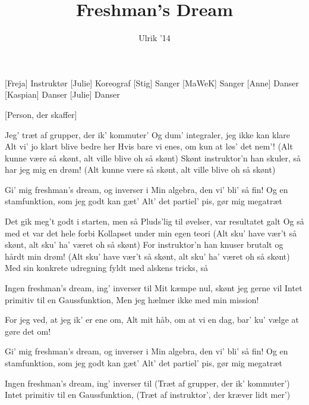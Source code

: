 \documentclass[a4paper,11pt]{article}
\title{Freshman's Dream}
\author{Ulrik '14}
\begin{document}
\maketitle

\begin{roles}
[Freja] Instruktør
[Julie] Koreograf
[Stig] Sanger
[MaWeK] Sanger
[Anne] Danser
[Kaspian] Danser
[Julie] Danser

\end{roles}

\begin{props}
[Person, der skaffer]
\end{props}


\begin{song}
 Jeg' træt af grupper, der ik' kommuter'
Og dum' integraler, jeg ikke kan klare
 Alt vi’ jo klart blive bedre her
Hvis bare vi enes, om kun at løs' det nem'!
 (Alt kunne være så skønt, alt ville blive oh så skønt)
 Skønt instruktor'n han skuler, så har jeg mig en drøm!
 (Alt kunne være så skønt, alt ville blive oh så skønt)

 Gi' mig freshman's dream, og inverser i
Min algebra, den vi' bli' så fin!
Og en stamfunktion, som jeg godt kan gæt'
Alt' det partiel' pis, gør mig megatræt

 Det gik meg't godt i starten, men så
Pluds'lig til øvelser, var resultatet galt
 Og så med et var det hele forbi
Kollapset under min egen teori
 (Alt sku' have vær't så skønt, alt sku' ha' været oh så skønt)
 For instruktor'n han knuser brutalt og hårdt min drøm!
 (Alt sku' have vær't så skønt, alt sku' ha' været oh så skønt)
 Med sin konkrete udregning fyldt med alskens tricks, så

 Ingen freshman's dream, ing' inverser til
Mit kæmpe nul, skønt jeg gerne vil
Intet primitiv til en Gaussfunktion,
Men jeg hælmer ikke med min mission!

 For jeg ved, at jeg ik' er ene om,
Alt mit håb, om at vi en dag, bar' ku' vælge at gøre det om!

 Gi' mig freshman's dream, og inverser i
Min algebra, den vi' bli' så fin!
Og en stamfunktion, som jeg godt kan gæt'
Alt' det partiel' pis, gør mig megatræt

 Ingen freshman's dream, ing' inverser til
(Træt af grupper, der ik’ kommuter’)
Intet primitiv til en Gaussfunktion,
(Træt af instruktor’, der kræver lidt mer’)


\end{song}
\end{document}
